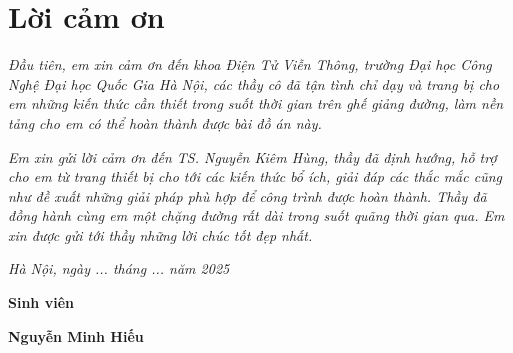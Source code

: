 \clearpage
{}

\chapter*{Lời cảm ơn}

\textit{Đầu tiên, em xin cảm ơn đến khoa Điện Tử Viễn Thông, trường Đại học Công Nghệ Đại học Quốc Gia Hà Nội, các thầy cô đã tận tình chỉ dạy và trang bị cho em những kiến thức cần thiết trong suốt thời gian trên ghế giảng đường, làm nền tảng cho em có thể hoàn thành được bài đồ án này.}

\textit{Em xin gửi lời cảm ơn đến TS. Nguyễn Kiêm Hùng, thầy đã định hướng, hỗ trợ cho em từ trang thiết bị cho tới các kiến thức bổ ích, giải đáp các thắc mắc cũng như đề xuất những giải pháp phù hợp để công trình được hoàn thành. Thầy đã đồng hành cùng em một chặng đường rất dài trong suốt quãng thời gian qua. Em xin được gửi tới thầy những lời chúc tốt đẹp nhất.}

\vspace{1cm}
\hspace{7cm}\textit{Hà Nội, ngày ... tháng ... năm 2025}

\hspace{9.4cm}\textbf{Sinh viên}
\vspace{2.5cm}


\hspace{8.8cm}\textbf{Nguyễn Minh Hiếu}


